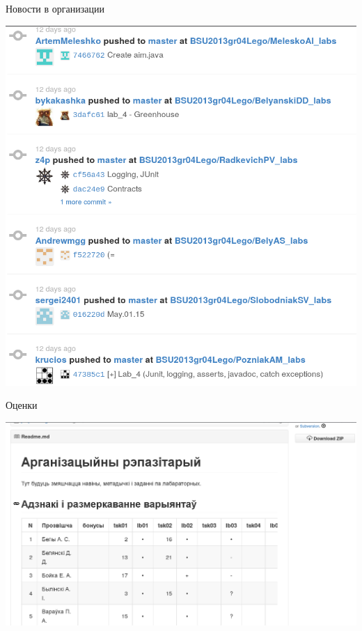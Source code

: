 \documentclass[xetex,14pt,serif,compress,hyperref={xetex}]{beamer}
\begin{document}
\begin{frame}{Новости в организации}
\begin{center}
\includegraphics[scale=0.4,keepaspectratio]{snp38.png}
\end{center}
\end{frame}


\begin{frame}{Оценки}
\begin{center}
\includegraphics[scale=0.4,keepaspectratio]{snp41.png}
\end{center}
\end{frame}
\end{document}

